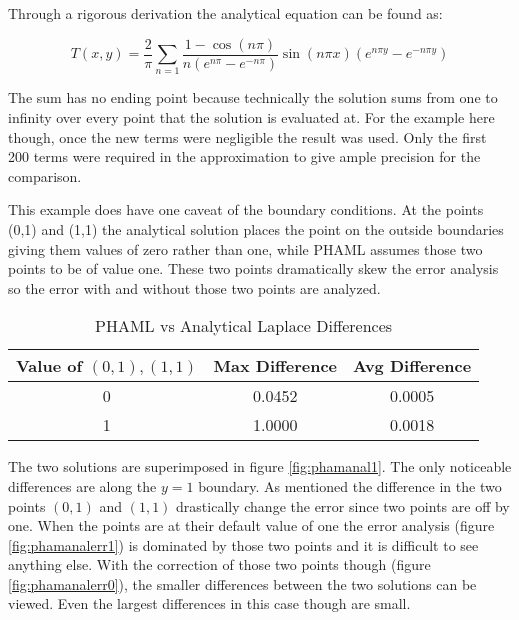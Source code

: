 
\newpage
Through a rigorous derivation the analytical equation can be found as:

\begin{equation}
T(x,y) = \frac{2}{\pi}\sum_{n=1}\frac{1 - \cos(n \pi)}{n (e^{n\pi} - e^{-n \pi})}\sin(n \pi x)(e^{n \pi y} - e^{-n \pi y})
\label{eq:anlap}    
\end{equation}

\cite{sheehan:website}

The sum has no ending point because technically the solution sums from one to infinity over every point that the solution is evaluated at.  For the example here though, once the new terms were negligible the result was used.  Only the first 200 terms were required in the approximation to give ample precision for the comparison.  

This example does have one caveat of the boundary conditions.  At the points (0,1) and (1,1) the analytical solution places the point on the outside boundaries giving them values of zero rather than one, while PHAML assumes those two points to be of value one.  These two points dramatically skew the error analysis so the error with and without those two points are analyzed.

\begin{table}[ht]
\caption{PHAML vs Analytical Laplace Differences}
\centering
\begin{center}
    \begin{tabular}{ | c | c | c |}
    \hline
    Value of $(0,1),(1,1)$ & Max Difference & Avg Difference\\ \hline
    0 & 0.0452 & 0.0005 \\ \hline
    1 & 1.0000 & 0.0018 \\ \hline
\end{tabular}
\end{center}
\end{table}

The two solutions are superimposed in figure \ref{fig:phamanal1}.  The only noticeable differences are along the $y=1$ boundary.  As mentioned the difference in the two points $(0,1)$ and $(1,1)$ drastically change the error since two points are off by one.  When the points are at their default value of one the error analysis (figure \ref{fig:phamanalerr1}) is dominated by those two points and it is difficult to see anything else.  With the correction of those two points though (figure \ref{fig:phamanalerr0}), the smaller differences between the two solutions can be viewed.  Even the largest differences in this case though are small.

